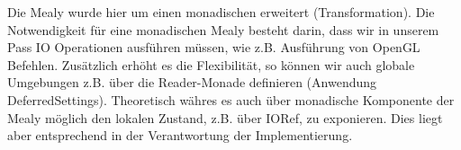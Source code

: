 Die Mealy wurde hier um einen monadischen erweitert (Transformation). Die Notwendigkeit für eine monadischen Mealy besteht darin, dass wir in unserem Pass IO Operationen ausführen müssen, wie z.B. Ausführung von OpenGL Befehlen. Zusätzlich erhöht es die Flexibilität, so können wir auch globale Umgebungen z.B. über die Reader-Monade definieren (Anwendung DeferredSettings). Theoretisch währes es auch über monadische Komponente der Mealy möglich den lokalen Zustand, z.B. über IORef, zu exponieren. Dies liegt aber entsprechend in der Verantwortung der Implementierung.
